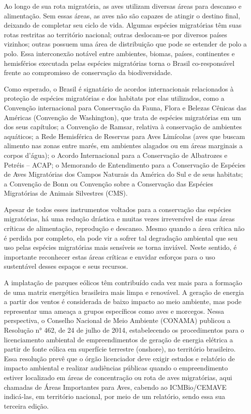 \documentclass[
]{scrbook}
\begin{document}
Ao longo de sua rota migratória, as aves utilizam diversas áreas para descanso e alimentação. Sem essas áreas, as aves não são capazes de atingir o destino final, deixando de completar seu ciclo de vida. Algumas espécies migratórias têm suas rotas restritas ao território nacional; outras deslocam-se por diversos países vizinhos; outras possuem uma área de distribuição que pode se estender de polo a polo. Essa interconexão notável entre ambientes, biomas, países, continentes e hemisférios executada pelas espécies migratórias torna o Brasil co-responsável frente ao compromisso de
conservação da biodiversidade.

Como esperado, o Brasil é signatário de acordos internacionais relacionados à proteção de espécies migratórias e dos habitats por elas utilizados, como a Convenção internacional para Conservação da Fauna, Flora e Belezas Cênicas das Américas (Convenção de Washington), que trata de espécies migratórias em um dos seus capítulos; a Convenção de Ramsar, relativa à conservação de ambientes aquáticos; a Rede Hemisférica de Reservas para Aves Limícolas (aves que buscam alimento nas zonas entre marés, em ambientes alagados ou em áreas marginais a corpos d'água); o Acordo Internacional para a Conservação de Albatrozes e Petréis -- ACAP; o Memorando de Entendimento para a Conservação de Espécies de Aves Migratórias dos Campos Naturais da América do Sul e de seus habitats; a Convenção de Bonn ou Convenção sobre a Conservação das Espécies Migratórias de Animais Silvestres (CMS).

Apesar de todos esses instrumentos voltados para a conservação das espécies migratórias, há uma redução drástica e muitas vezes irreversível de suas áreas críticas de alimentação, reprodução e descanso. Mesmo quando a área crítica não é perdida por completo, ela pode vir a sofrer tal degradação ambiental que seu uso pelas espécies migratórias mais sensíveis se torna inviável. Neste sentido, é importante reconhecer estas áreas críticas e envidar esforços para o uso sustentável desses espaços e seus recursos.

A implatação de parques eólicos têm contribuído cada vez mais para a formação de uma matriz energética brasileira mais limpa e renovável. A geração de energia a partir dos ventos é considerada de baixo impacto ao meio ambiente, mas pode representar uma ameaça a grupos específicos como aves e morcegos. Nessa perspectiva, o Conselho Nacional de Meio Ambiente (CONAMA) publicou a Resolução n° 462, de 24 de julho de 2014, estabelecendo os procedimentos para o licenciamento ambiental de empreendimentos de geração de energia elétrica a partir de fonte eólica em superfície terrestre (onshore), no território brasileiro. Essa resolução prevê que o órgão licenciador deve exigir estudos e relatório de impacto ambiental e realizar audiências públicas quando o empreendimento estiver localizado em áreas de concentração ou rota de aves migratórias, aqui chamadas de Áreas Importantes para Aves, cabendo ao ICMBio/CEMAVE indicá-las, em território nacional, por meio de um relatório, sendo essa sua terceira edição.
\end{document}
